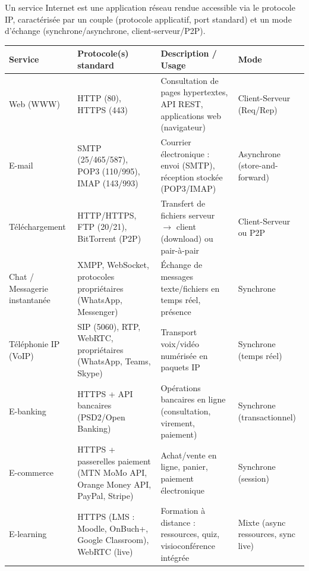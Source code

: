 \documentclass[11pt]{article}
\newcommand{\cle}[1]{{\popxbold\color{popdark}#1}}
\begin{document}
\begin{definition}
Un service Internet est une application réseau rendue accessible via le protocole IP, caractérisée par un couple (protocole applicatif, port standard) et un mode d'échange (synchrone/asynchrone, client-serveur/P2P).
\end{definition}

\begin{propriete}
\begin{center}
\begin{tabularx}{\linewidth}{|l|l|X|l|}
\hline
\rowcolor{popblueL}
\textbf{Service} & \textbf{Protocole(s) standard} & \textbf{Description / Usage} & \textbf{Mode} \\
\hline
\cle{Web (WWW)} & HTTP (80), HTTPS (443) & Consultation de pages hypertextes, API REST, applications web (navigateur) & Client-Serveur (Req/Rep) \\
\cle{E-mail} & SMTP (25/465/587), POP3 (110/995), IMAP (143/993) & Courrier électronique : envoi (SMTP), réception stockée (POP3/IMAP) & Asynchrone (store-and-forward) \\
\cle{Téléchargement} & HTTP/HTTPS, FTP (20/21), BitTorrent (P2P) & Transfert de fichiers serveur $\to$ client (download) ou pair-à-pair & Client-Serveur ou P2P \\
\cle{Chat / Messagerie instantanée} & XMPP, WebSocket, protocoles propriétaires (WhatsApp, Messenger) & Échange de messages texte/fichiers en temps réel, présence & Synchrone \\
\cle{Téléphonie IP (VoIP)} & SIP (5060), RTP, WebRTC, propriétaires (WhatsApp, Teams, Skype) & Transport voix/vidéo numérisée en paquets IP & Synchrone (temps réel) \\
\cle{E-banking} & HTTPS + API bancaires (PSD2/Open Banking) & Opérations bancaires en ligne (consultation, virement, paiement) & Synchrone (transactionnel) \\
\cle{E-commerce} & HTTPS + passerelles paiement (MTN MoMo API, Orange Money API, PayPal, Stripe) & Achat/vente en ligne, panier, paiement électronique & Synchrone (session) \\
\cle{E-learning} & HTTPS (LMS : Moodle, OnBuch+, Google Classroom), WebRTC (live) & Formation à distance : ressources, quiz, visioconférence intégrée & Mixte (async ressources, sync live) \\
\hline
\end{tabularx}
\end{center}
\end{propriete}
\end{document}
